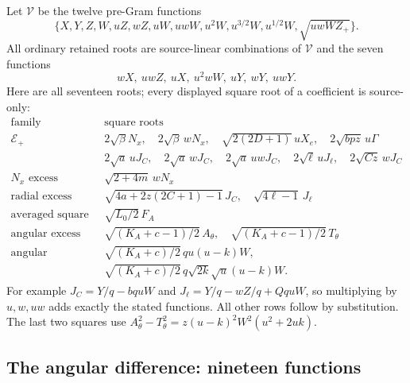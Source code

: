 \documentclass[11pt]{article}
\begin{document}
Let $\mathcal V$ be the twelve pre-Gram functions
\[
 \{X,Y,Z,W,uZ,wZ,uW,uwW,u^2W,
                     u^{3/2}W,u^{1/2}W,\sqrt{uwWZ_+}\}.
\]
All ordinary retained roots are source-linear combinations of
$\mathcal V$ and the seven functions
\[
                   wX,\ uwZ,\ uX,\ u^2wW,\ uY,\ wY,\ uwY.
\]
Here are all seventeen roots; every displayed square root of a
coefficient is source-only:
\[
\begin{array}{c|l}
\text{family}&\text{square roots}\\\hline
\mathcal E_+&2\sqrt\beta N_x,\quad2\sqrt\beta\,wN_x,\quad
 \sqrt{2(2D+1)}\,uX_e,\quad2\sqrt{bpz}\,u\Gamma\\
 &2\sqrt a\,uJ_C,\quad2\sqrt a\,wJ_C,\quad2\sqrt a\,uwJ_C,\quad
 2\sqrt\ell\,uJ_\ell,\quad2\sqrt{Cz}\,wJ_C\\
N_x\text{ excess}&\sqrt{2+4m}\,wN_x\\
\text{radial excess}&\sqrt{4a+2z(2C+1)-1}\,J_C,\quad
                              \sqrt{4\ell-1}\,J_\ell\\
\text{averaged square}&\sqrt{L_0/2}\,F_A\\
\text{angular excess}&\sqrt{(K_A+c-1)/2}\,A_\theta,\quad
                       \sqrt{(K_A+c-1)/2}\,T_\theta\\
\text{angular difference}&\sqrt{(K_A+c)/2}\,qu(u-k)W,\\
 &\sqrt{(K_A+c)/2}\,q\sqrt{2k}\sqrt u(u-k)W.
\end{array}
\]
For example $J_C=Y/q-bquW$ and
$J_\ell=Y/q-wZ/q+QquW$, so multiplying by $u,w,uw$ adds
exactly the stated functions. All other rows follow by substitution.
The last two squares use
$A_\theta^2-T_\theta^2=z(u-k)^2W^2(u^2+2uk)$.

\subsection{The angular difference: nineteen functions}
\end{document}
